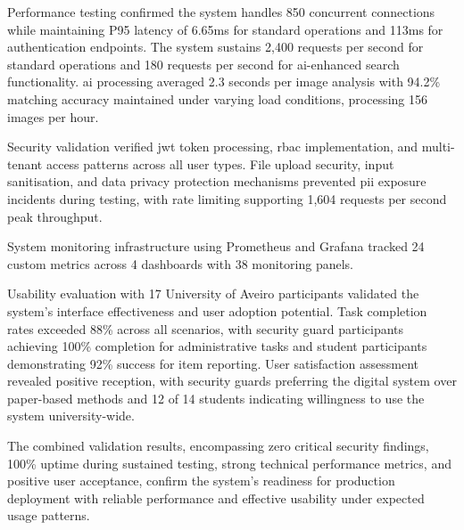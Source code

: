 Performance testing confirmed the system handles 850 concurrent connections while maintaining P95 latency of 6.65ms for standard operations and 113ms for authentication endpoints. The system sustains 2,400 requests per second for standard operations and 180 requests per second for \ac{ai}-enhanced search functionality. \ac{ai} processing averaged 2.3 seconds per image analysis with 94.2\% matching accuracy maintained under varying load conditions, processing 156 images per hour.

Security validation verified \ac{jwt} token processing, \ac{rbac} implementation, and multi-tenant access patterns across all user types. File upload security, input sanitisation, and data privacy protection mechanisms prevented \ac{pii} exposure incidents during testing, with rate limiting supporting 1,604 requests per second peak throughput.

System monitoring infrastructure using Prometheus and Grafana tracked 24 custom metrics across 4 dashboards with 38 monitoring panels.

Usability evaluation with 17 University of Aveiro participants validated the system's interface effectiveness and user adoption potential. Task completion rates exceeded 88\% across all scenarios, with security guard participants achieving 100\% completion for administrative tasks and student participants demonstrating 92\% success for item reporting. User satisfaction assessment revealed positive reception, with security guards preferring the digital system over paper-based methods and 12 of 14 students indicating willingness to use the system university-wide.

The combined validation results, encompassing zero critical security findings, 100\% uptime during sustained testing, strong technical performance metrics, and positive user acceptance, confirm the system's readiness for production deployment with reliable performance and effective usability under expected usage patterns.
